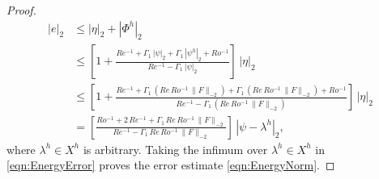 \begin{proof}
  \begin{align}
    |e|_2 
    &\le |\eta|_2 
    + |\Phi^h|_2 \nonumber \\[0.2cm]
    &\le \left[
    1 
    + \frac{Re^{-1} 
      + \Gamma_1 \, |\psi|_2 
      + \Gamma_1 \, |\psi^h|_2 
      + Ro^{-1}} {Re^{-1} 
      - \Gamma_1 \, |\psi|_2} 
      \right] \, |\eta|_2 \nonumber \\[0.2cm]
    &\le \left[
    1 
    + \frac{Re^{-1} 
      + \Gamma_1 \, \left( Re \, Ro^{-1} \, \| F \|_{-2} \right) 
      + \Gamma_1 \, \left( Re \, Ro^{-1} \, \| F \|_{-2} \right) 
      + Ro^{-1}} {Re^{-1} 
      - \Gamma_1 \, \left( Re \, Ro^{-1} \, \| F \|_{-2} \right) } 
      \right] \, |\eta|_2 \nonumber \\
  &= 
  \left[
  \frac{
  Ro^{-1}
  + 2 \, Re^{-1} 
  + \Gamma_1 \, Re \, Ro^{-1} \, \| F \|_{-2}
  }
  {
  Re^{-1}
  - \Gamma_1 \, Re \, Ro^{-1} \, \| F \|_{-2}
  }
  \right] \, | \psi-\lambda^h |_2 ,
    \label{eqn:EnergyError}
  \end{align}
where $\lambda^h \in X^h$ is arbitrary.
Taking the infimum over $\lambda^h \in X^h$ in \eqref{eqn:EnergyError} proves the error estimate \eqref{eqn:EnergyNorm}.
\hfill 
\end{proof}

